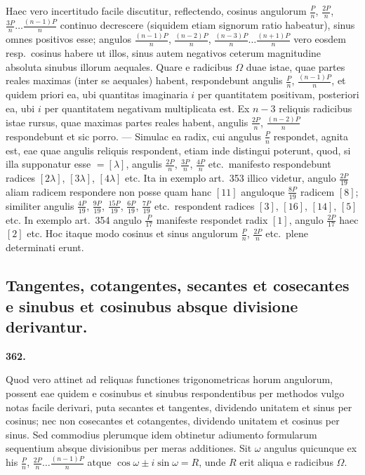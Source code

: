 \documentclass[12pt,a4paper]{article}
\theoremstyle{plain}
\theoremstyle{definition}
\theoremstyle{remark}
\begin{document}
Haec vero incertitudo facile discutitur, reflectendo, cosinus angulorum $\tfrac{P}{n}$, $\tfrac{2P}{n}$, $\tfrac{3P}{n} \ldots \tfrac{(n-1)P}{n}$ continuo decrescere (siquidem etiam signorum ratio habeatur), sinus omnes positivos esse; angulos $\tfrac{(n-1)P}{n}$, $\tfrac{(n-2)P}{n}$, $\tfrac{(n-3)P}{n} \ldots \tfrac{(n+1)P}{n}$ vero eosdem resp.\ cosinus habere ut illos, sinus autem negativos ceterum magnitudine absoluta sinubus illorum aequales. Quare e radicibus $\Omega$ duae istae, quae partes reales maximas (inter se aequales) habent, respondebunt angulis $\tfrac{P}{n}$, $\tfrac{(n-1)P}{n}$, et quidem priori ea, ubi quantitas imaginaria $i$ per quantitatem positivam, posteriori ea, ubi $i$ per quantitatem negativam multiplicata est. Ex $n-3$ reliquis radicibus istae rursus, quae maximas partes reales habent, angulis $\tfrac{2P}{n}$, $\tfrac{(n-2)P}{n}$ respondebunt et sic porro. --- Simulac ea radix, cui angulus $\tfrac{P}{n}$ respondet, agnita est, eae quae angulis reliquis respondent, etiam inde distingui poterunt, quod, si illa supponatur esse $= [\lambda]$, angulis $\tfrac{2P}{n}$, $\tfrac{3P}{n}$, $\tfrac{4P}{n}$ etc.\ manifesto respondebunt radices $[2\lambda]$, $[3\lambda]$, $[4\lambda]$ etc. Ita in exemplo art.\ 353 illico videtur, angulo $\tfrac{2P}{19}$ aliam radicem respondere non posse quam hanc $[11]$ anguloque $\tfrac{8P}{19}$ radicem $[8]$; similiter angulis $\tfrac{4P}{19}$, $\tfrac{9P}{19}$, $\tfrac{15P}{19}$, $\tfrac{6P}{19}$, $\tfrac{7P}{19}$ etc.\ respondent radices $[3]$, $[16]$, $[14]$, $[5]$ etc. In exemplo art.\ 354 angulo $\tfrac{P}{17}$ manifeste respondet radix $[1]$, angulo $\tfrac{2P}{17}$ haec $[2]$ etc. Hoc itaque modo cosinus et sinus angulorum $\tfrac{P}{n}$, $\tfrac{2P}{n}$ etc.\ plene determinati erunt.


\subsection*{Tangentes, cotangentes, secantes et cosecantes e sinubus et cosinubus absque divisione derivantur.}

\begin{center}
\textbf{362.}
\end{center}

Quod vero attinet ad reliquas functiones trigonometricas horum angulorum, possent eae quidem e cosinubus et sinubus respondentibus per methodos vulgo notas facile derivari, puta secantes et tangentes, dividendo unitatem et sinus per cosinus; nec non cosecantes et cotangentes, dividendo unitatem et cosinus per sinus. Sed commodius plerumque idem obtinetur adiumento formularum sequentium absque divisionibus per meras additiones. Sit $\omega$ angulus quicunque ex his $\tfrac{P}{n}$, $\tfrac{2P}{n} \ldots \tfrac{(n-1)P}{n}$ atque $\cos\omega \pm i\sin\omega = R$, unde $R$ erit aliqua e radicibus $\Omega$.
\end{document}
